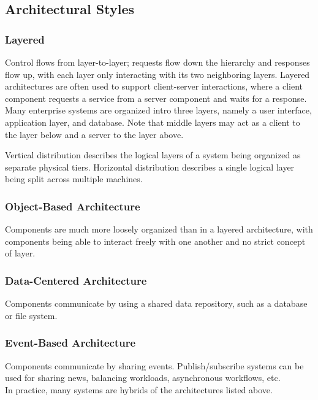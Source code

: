 \documentclass[12pt,titlepage]{article}
\begin{document}
    \subsection{Architectural Styles}
      \subsubsection{Layered}
        Control flows from layer-to-layer; requests flow down the hierarchy and responses flow up, with each layer only interacting with its two neighboring layers.
        Layered architectures are often used to support client-server interactions, where a client component requests a service from a server component and waits for
        a response. Many enterprise systems are organized intro three layers, namely a user interface, application layer, and database. Note that middle layers may
        act as a client to the layer below and a server to the layer above.

        Vertical distribution describes the logical layers of a system being organized as separate physical tiers. Horizontal distribution describes a single logical
        layer being split across multiple machines.

      \subsubsection{Object-Based Architecture}
        Components are much more loosely organized than in a layered architecture, with components being able to interact freely with one another and no strict concept
        of layer.

      \subsubsection{Data-Centered Architecture}
        Components communicate by using a shared data repository, such as a database or file system.

      \subsubsection{Event-Based Architecture}
        Components communicate by sharing events. Publish/subscribe systems can be used for sharing news, balancing workloads, asynchronous workflows, etc.\\

      In practice, many systems are hybrids of the architectures listed above.
\end{document}
